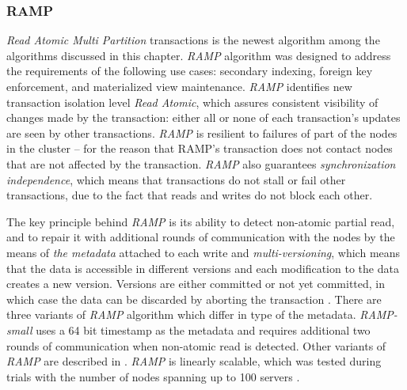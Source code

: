 \subsubsection{RAMP}\label{sec:theory:transactions:ramp}
\emph{Read Atomic Multi Partition} transactions \cite{Bailis:2014} is the newest algorithm among the algorithms discussed in this chapter. 
\emph{RAMP} algorithm was designed to address the requirements of the following use cases: secondary indexing, foreign key
enforcement, and materialized view maintenance.
\emph{RAMP} identifies new transaction isolation level \emph{Read Atomic}, which 
assures consistent visibility of changes made by the transaction: either all or none of each transaction's updates are seen by other transactions.
\emph{RAMP} is resilient to failures of part of the nodes in the cluster -- for the reason that RAMP's transaction does not contact nodes that are not affected by the transaction. 
\emph{RAMP} also guarantees \emph{synchronization independence}, which means that transactions do not stall or fail other transactions, due to the fact that reads and writes do not block each other. 

The key principle behind \emph{RAMP} is its ability to detect non-atomic partial read, and to repair it with additional rounds of communication with the nodes by the means of \emph{the metadata} attached to each write and \emph{multi-versioning}, which means that the data is accessible in different versions and each modification to the data creates a new version. Versions are either committed or not yet committed, in which case the data can be discarded by aborting the transaction \cite[p. 6]{Bailis:2014}. 
There are three variants of \emph{RAMP} algorithm which differ in type of the metadata. \emph{RAMP-small} uses a 64 bit timestamp as the metadata and requires additional two rounds of communication when non-atomic read is detected. Other variants of \emph{RAMP} are described in \cite[p. 5]{Bailis:2014}.
\emph{RAMP} is linearly scalable, which was tested during trials with the number of nodes spanning up to 100 servers \cite[p. 10]{Bailis:2014}.

%


